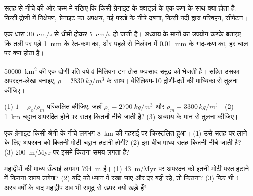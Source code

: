 \begin{exercise}[$\star$]\label{exo:g12:destruction-of-mountains:5}
सतह से नीचे की ओर क्रम में रखिए कि किसी ग्रेनाइट के क्वार्ट्ज़ के एक कण के साथ
क्या होता है: किसी द्रोणी में निक्षेपण, ग्रेनाइट का अपक्षय,
नई परतों के नीचे दबना, किसी नदी द्वारा परिवहन, सीमेंटन।
\end{exercise}

\begin{exercise}[$\star\star$]\label{exo:g12:destruction-of-mountains:6}
एक धारा \qty{30}{cm/s} से धीमी होकर \qty{5}{cm/s} हो जाती है। अध्याय के मानों का
उपयोग करके बताइए कि तली पर पड़े \qty{1}{mm} के रेत-कण का, और
पहले से निलंबन में \qty{0.01}{mm} के गाद-कण का, हर चाल पर
क्या होता है।
\end{exercise}

\begin{exercise}[$\star\star$]\label{exo:g12:destruction-of-mountains:7}
\qty{50000}{km^2} की एक द्रोणी प्रति वर्ष 4 मिलियन टन ठोस अवसाद समुद्र को भेजती है।
 सहित उसका अपरदन-लेखा बनाइए, $\rho =
\qty{2830}{kg/m^3}$ के साथ। बेरिलियम-10 द्रोणी-दरों की माध्यिका से तुलना कीजिए।
\end{exercise}

\begin{exercise}[$\star\star$]\label{exo:g12:destruction-of-mountains:8}
(1) $1 - \rho_c/\rho_m$ परिकलित कीजिए, जहाँ $\rho_c = \qty{2700}{kg/m^3}$ और
$\rho_m = \qty{3300}{kg/m^3}$। (2) \qty{1}{km} चट्टान
अपरदित होने पर सतह कितनी नीचे जाती है? (3) अध्याय के मान से तुलना कीजिए।
\end{exercise}

\begin{exercise}[$\star\star$]\label{exo:g12:destruction-of-mountains:9}
एक ग्रेनाइट किसी श्रेणी के नीचे लगभग \qty{8}{km} की गहराई पर क्रिस्टलित हुआ। (1) उसे सतह पर
लाने के लिए अपरदन को कितनी मोटी चट्टान हटानी होगी? (2) इस बीच माध्य सतह
कितनी नीचे जाती है? (3) \qty{200}{m/Myr} पर
इसमें कितना समय लगता है?
\end{exercise}

\begin{exercise}[$\star\star$]\label{exo:g12:destruction-of-mountains:10}
महाद्वीपों की माध्य ऊँचाई लगभग \qty{794}{m} है। (1)
\qty{43}{m/Myr} पर अपरदन को इतनी मोटी परत हटाने में कितना समय लगेगा?
(2) यदि  को ध्यान में रखा जाए और दर वही रहे, तो कितना?
(3) फिर भी 4 अरब वर्षों के बाद महाद्वीप अब भी समुद्र से ऊपर क्यों
खड़े हैं?
\end{exercise}

